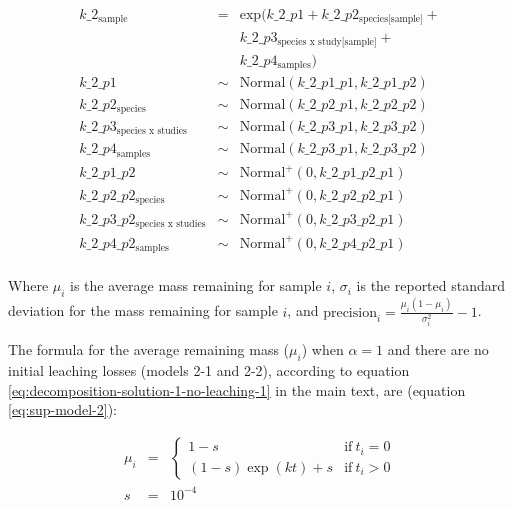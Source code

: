 \documentclass[
  12pt,
]{article}
\begin{document}
\begin{equation}
\begin{aligned}
k\_2_{\text{sample}} & = & \text{exp}(k\_2\_p1 + k\_2\_p2_{\text{species[sample]}} + \\
                         && k\_2\_p3_{\text{species x study[sample]}} + \\
                         && k\_2\_p4_{\text{samples}})\\
k\_2\_p1 & \sim & \text{Normal}(k\_2\_p1\_p1, k\_2\_p1\_p2)\\
k\_2\_p2_{\text{species}} & \sim & \text{Normal}(k\_2\_p2\_p1, k\_2\_p2\_p2)\\
k\_2\_p3_{\text{species x studies}} & \sim & \text{Normal}(k\_2\_p3\_p1, k\_2\_p3\_p2)\\
k\_2\_p4_{\text{samples}} & \sim & \text{Normal}(k\_2\_p3\_p1, k\_2\_p3\_p2)\\
k\_2\_p1\_p2 & \sim &  \text{Normal}^+(0, k\_2\_p1\_p2\_p1)\\
k\_2\_p2\_p2_{\text{species}} & \sim &  \text{Normal}^+(0, k\_2\_p2\_p2\_p1)\\
k\_2\_p3\_p2_{\text{species x studies}} & \sim &  \text{Normal}^+(0, k\_2\_p3\_p2\_p1)\\
k\_2\_p4\_p2_{\text{samples}} & \sim &  \text{Normal}^+(0, k\_2\_p4\_p2\_p1)\\
\label{eq:sup-model-1}
\end{aligned}
\end{equation}

Where \(\mu_i\) is the average mass remaining for sample \(i\), \(\sigma_i\) is the reported standard deviation for the mass remaining for sample \(i\), and \(\text{precision}_i = \frac{\mu_i(1 - \mu_i)}{\sigma_i^2} -1\).

The formula for the average remaining mass (\(\mu_i\)) when \(\alpha=1\) and there are no initial leaching losses (models 2-1 and 2-2), according to equation \eqref{eq:decomposition-solution-1-no-leaching-1} in the main text, are (equation \eqref{eq:sup-model-2}):

\begin{equation}
\begin{aligned}
\mu_i & = & \begin{cases} 
1 - s & \text{if}~t_i=0\\
(1 - s) \exp(k t) + s & \text{if}~t_i>0
\end{cases}\\
s & = & \ensuremath{10^{-4}}\\
\label{eq:sup-model-2}
\end{aligned}
\end{equation}
\end{document}

